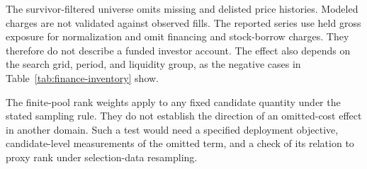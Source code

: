\documentclass[10pt,letterpaper]{article}
\begin{document}
The survivor-filtered universe omits missing and delisted price histories. Modeled charges are not validated against observed fills. The reported series use held gross exposure for normalization and omit financing and stock-borrow charges. They therefore do not describe a funded investor account. The effect also depends on the search grid, period, and liquidity group, as the negative cases in Table~\ref{tab:finance-inventory} show.

The finite-pool rank weights apply to any fixed candidate quantity under the stated sampling rule. They do not establish the direction of an omitted-cost effect in another domain. Such a test would need a specified deployment objective, candidate-level measurements of the omitted term, and a check of its relation to proxy rank under selection-data resampling.



\end{document}
